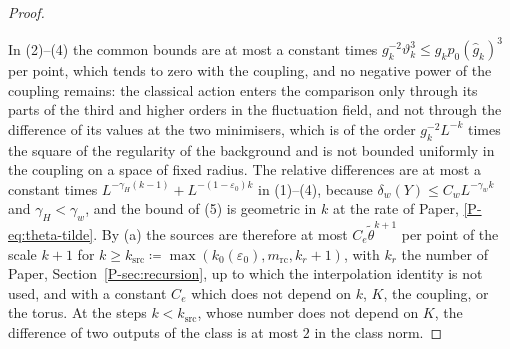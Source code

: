 \documentclass[11pt]{preprint}
\numberwithin{equation}{section}
\theoremstyle{definition}
\theoremstyle{remark}
\theoremstyle{plain}
\begin{document}
\begin{proof}
\begin{enumerate}[label=(\arabic*)]
\end{enumerate}
In (2)--(4) the common bounds are at most a constant times $g_k^{-2}\vartheta_k^3 \leq g_kp_0(\hat g_k)^3$ per point, which tends to zero with the coupling, and no negative power of the coupling remains: the classical action enters the comparison only through its parts of the third and higher orders in the fluctuation field, and not through the difference of its values at the two minimisers, which is of the order $g_k^{-2}L^{-k}$ times the square of the regularity of the background and is not bounded uniformly in the coupling on a space of fixed radius. The relative differences are at most a constant times $L^{-\gamma_H(k-1)} + L^{-(1-\varepsilon_0)k}$ in (1)--(4), because $\delta_w(Y) \leq C_wL^{-\gamma_wk}$ and $\gamma_H < \gamma_w$, and the bound of (5) is geometric in $k$ at the rate of Paper, \eqref{P-eq:theta-tilde}. By (a) the sources are therefore at most $C_e\tilde\theta^{k+1}$ per point of the scale $k + 1$ for $k \geq k_{\mathrm{src}} \coloneqq \max(k_0(\varepsilon_0), m_{\mathrm{rc}}, k_r + 1)$, with $k_r$ the number of Paper, Section~\ref{P-sec:recursion}, up to which the interpolation identity is not used, and with a constant $C_e$ which does not depend on $k$, $K$, the coupling, or the torus. At the steps $k < k_{\mathrm{src}}$, whose number does not depend on $K$, the difference of two outputs of the class is at most $2$ in the class norm.


\end{proof}
\end{document}
